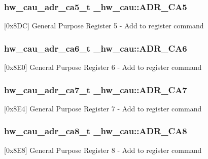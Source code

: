 \subsubsection[{\texorpdfstring{A\+D\+R\+\_\+\+C\+A5}{ADR_CA5}}]{ {\bf hw\+\_\+cau\+\_\+adr\+\_\+ca5\+\_\+t} \+\_\+hw\+\_\+cau\+::\+A\+D\+R\+\_\+\+C\+A5}\hypertarget{struct__hw__cau_a6599fdf1296f67c1e65d897fc7f044fb}{}\label{struct__hw__cau_a6599fdf1296f67c1e65d897fc7f044fb}
\mbox{[}0x8\+DC\mbox{]} General Purpose Register 5 -\/ Add to register command 
\subsubsection[{\texorpdfstring{A\+D\+R\+\_\+\+C\+A6}{ADR_CA6}}]{ {\bf hw\+\_\+cau\+\_\+adr\+\_\+ca6\+\_\+t} \+\_\+hw\+\_\+cau\+::\+A\+D\+R\+\_\+\+C\+A6}\hypertarget{struct__hw__cau_ae2b3ad98c35be35293a49a1a7c129107}{}\label{struct__hw__cau_ae2b3ad98c35be35293a49a1a7c129107}
\mbox{[}0x8\+E0\mbox{]} General Purpose Register 6 -\/ Add to register command 
\subsubsection[{\texorpdfstring{A\+D\+R\+\_\+\+C\+A7}{ADR_CA7}}]{ {\bf hw\+\_\+cau\+\_\+adr\+\_\+ca7\+\_\+t} \+\_\+hw\+\_\+cau\+::\+A\+D\+R\+\_\+\+C\+A7}\hypertarget{struct__hw__cau_ad3c3d4a0da4ca10ef86891a845b281da}{}\label{struct__hw__cau_ad3c3d4a0da4ca10ef86891a845b281da}
\mbox{[}0x8\+E4\mbox{]} General Purpose Register 7 -\/ Add to register command 
\subsubsection[{\texorpdfstring{A\+D\+R\+\_\+\+C\+A8}{ADR_CA8}}]{ {\bf hw\+\_\+cau\+\_\+adr\+\_\+ca8\+\_\+t} \+\_\+hw\+\_\+cau\+::\+A\+D\+R\+\_\+\+C\+A8}\hypertarget{struct__hw__cau_ad29ba702f8f68a9a62da1e3c993f55cb}{}\label{struct__hw__cau_ad29ba702f8f68a9a62da1e3c993f55cb}
\mbox{[}0x8\+E8\mbox{]} General Purpose Register 8 -\/ Add to register command 

